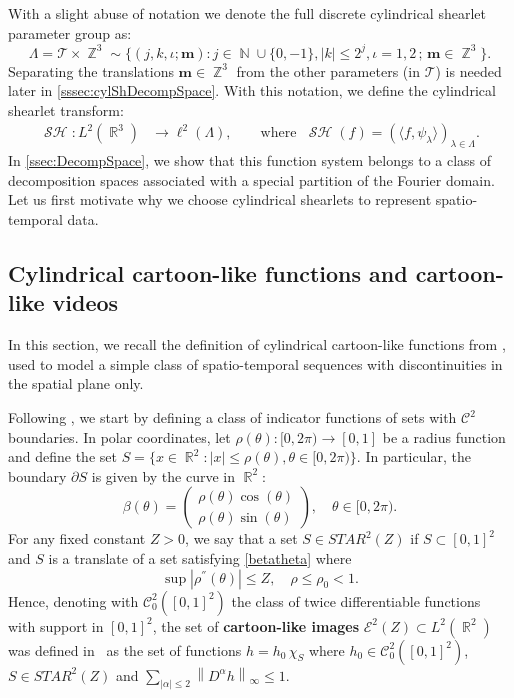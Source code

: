 \documentclass[11pt,a4paper]{article}
\numberwithin{equation}{section}
\DeclareMathOperator{\R}{\mathbb{R}}
\DeclareMathOperator{\N}{\mathbb{N}}
\DeclareMathOperator{\Z}{\mathbb{Z}}
\newcommand{\norm}[1]{\left\lVert#1\right\rVert}
\newcommand{\abs}[1]{\left|#1\right|}
\newcommand{\mcT}{\mathcal{T}}  %
\DeclareMathOperator{\sh}{\mathcal{SH}}
\renewcommand{\vec}[1]{\boldsymbol{#1}} %
\begin{document}
With a slight abuse of notation we denote the full discrete cylindrical shearlet parameter group as: 
$$\Lambda = \mcT \times \Z^3 \sim \lbrace (j, k, \iota; \vec{m}) : j \in \N \cup \{0,-1\}, |k| \leqslant 2^j, \iota = 1,2 \, ; \, \vec{m} \in \Z^3 \rbrace.$$
Separating the translations $\vec{m} \in \Z^3$ from the other parameters (in $\mcT$) is needed later in \cref{sssec:cylShDecompSpace}. With this notation,  we define the cylindrical shearlet transform:
\begin{align} \label{eq:cylShTransform}
    \sh: L^2(\R^3) &\longrightarrow \ell^2(\Lambda), \qquad \text{where } \; \sh(f) = \left(\langle f, \psi_\lambda \rangle\right)_{\lambda \in \Lambda}.
\end{align}
In \cref{ssec:DecompSpace}, we show that this function system belongs to a class of decomposition spaces associated with a special partition of the Fourier domain. Let us first motivate why we choose cylindrical shearlets to represent spatio-temporal data.

\subsection{Cylindrical cartoon-like functions and cartoon-like videos} \label{ssec:slantedData}

In this section, we recall the definition of cylindrical cartoon-like functions from \cite{Easley21}, used to model a simple class of spatio-temporal sequences with discontinuities in the spatial plane only. 

Following \cite{donoho2001}, we start by defining a class of indicator functions of sets with $\mathcal{C}^2 $ boundaries. In polar coordinates, let $\rho(\theta): [0, 2\pi) \rightarrow [0, 1]$ be a radius function  and define the set $S = \{x \in \R^2: \abs{x} \leq \rho(\theta), \theta \in [0,2 \pi)\}$.  In particular, the boundary $\partial S$ is given by the curve in $\R^2 $:
\begin{equation}\label{betatheta}
    \beta(\theta) = \begin{pmatrix}
        \rho(\theta) \cos(\theta) \\
        \rho(\theta) \sin(\theta)
    \end{pmatrix},
    \quad \theta \in [0, 2\pi).
\end{equation}
For any fixed constant $Z > 0$,  we say that a set $S \in  {STAR}^2(Z)$ if $S \subset [0, 1]^2$ and $S$ is a translate of a set satisfying \eqref{betatheta} where 
\begin{equation}\label{sup:cond}
\sup \abs{\rho^{''}(\theta)} \leq Z,\quad \rho \leq \rho_{0} < 1.
\end{equation}
Hence, denoting with $\mathcal{C}_0^2 ([0, 1]^2)$ the class of twice differentiable functions with support in $[0, 1]^2$, the set of {\bf cartoon-like images} $\mathcal{E}^2(Z) \subset L^2(\R^2)$ was defined in~\cite{donoho2001} as the
set of functions 
$h = h_0 \, \chi_S$
where
$h_0 \in \mathcal{C}_0^ 2 ([0, 1]^2 )$, $S \in  {STAR}^2(Z)$ and $\sum_{\abs{\alpha} \leq 2} \norm{D^{\alpha} h}_{\infty}\leq 1.$  
\end{document}

